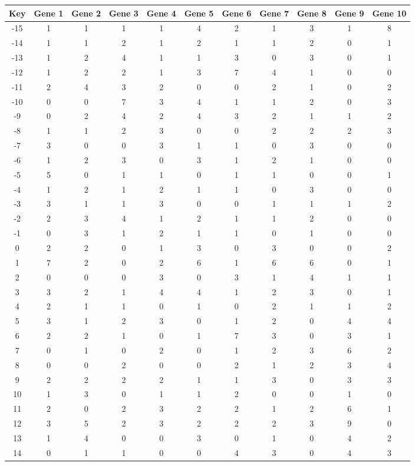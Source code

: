 \begin{tabular}{|c|c|c|c|c|c|c|c|c|c|c|}
\hline
Key & Gene 1 & Gene 2 & Gene 3 & Gene 4 & Gene 5 & Gene 6 & Gene 7 & Gene 8 & Gene 9 & Gene 10 \\
\hline
-15 & 1 & 1 & 1 & 1 & 4 & 2 & 1 & 3 & 1 & 8 \\
-14 & 1 & 1 & 2 & 1 & 2 & 1 & 1 & 2 & 0 & 1 \\
-13 & 1 & 2 & 4 & 1 & 1 & 3 & 0 & 3 & 0 & 1 \\
-12 & 1 & 2 & 2 & 1 & 3 & 7 & 4 & 1 & 0 & 0 \\
-11 & 2 & 4 & 3 & 2 & 0 & 0 & 2 & 1 & 0 & 2 \\
-10 & 0 & 0 & 7 & 3 & 4 & 1 & 1 & 2 & 0 & 3 \\
-9 & 0 & 2 & 4 & 2 & 4 & 3 & 2 & 1 & 1 & 2 \\
-8 & 1 & 1 & 2 & 3 & 0 & 0 & 2 & 2 & 2 & 3 \\
-7 & 3 & 0 & 0 & 3 & 1 & 1 & 0 & 3 & 0 & 0 \\
-6 & 1 & 2 & 3 & 0 & 3 & 1 & 2 & 1 & 0 & 0 \\
-5 & 5 & 0 & 1 & 1 & 0 & 1 & 1 & 0 & 0 & 1 \\
-4 & 1 & 2 & 1 & 2 & 1 & 1 & 0 & 3 & 0 & 0 \\
-3 & 3 & 1 & 1 & 3 & 0 & 0 & 1 & 1 & 1 & 2 \\
-2 & 2 & 3 & 4 & 1 & 2 & 1 & 1 & 2 & 0 & 0 \\
-1 & 0 & 3 & 1 & 2 & 1 & 1 & 0 & 1 & 0 & 0 \\
0 & 2 & 2 & 0 & 1 & 3 & 0 & 3 & 0 & 0 & 2 \\
1 & 7 & 2 & 0 & 2 & 6 & 1 & 6 & 6 & 0 & 1 \\
2 & 0 & 0 & 0 & 3 & 0 & 3 & 1 & 4 & 1 & 1 \\
3 & 3 & 2 & 1 & 4 & 4 & 1 & 2 & 3 & 0 & 1 \\
4 & 2 & 1 & 1 & 0 & 1 & 0 & 2 & 1 & 1 & 2 \\
5 & 3 & 1 & 2 & 3 & 0 & 1 & 2 & 0 & 4 & 4 \\
6 & 2 & 2 & 1 & 0 & 1 & 7 & 3 & 0 & 3 & 1 \\
7 & 0 & 1 & 0 & 2 & 0 & 1 & 2 & 3 & 6 & 2 \\
8 & 0 & 0 & 2 & 0 & 0 & 2 & 1 & 2 & 3 & 4 \\
9 & 2 & 2 & 2 & 2 & 1 & 1 & 3 & 0 & 3 & 3 \\
10 & 1 & 3 & 0 & 1 & 1 & 2 & 0 & 0 & 1 & 0 \\
11 & 2 & 0 & 2 & 3 & 2 & 2 & 1 & 2 & 6 & 1 \\
12 & 3 & 5 & 2 & 3 & 2 & 2 & 2 & 3 & 9 & 0 \\
13 & 1 & 4 & 0 & 0 & 3 & 0 & 1 & 0 & 4 & 2 \\
14 & 0 & 1 & 1 & 0 & 0 & 4 & 3 & 0 & 4 & 3 \\
\hline
\end{tabular}